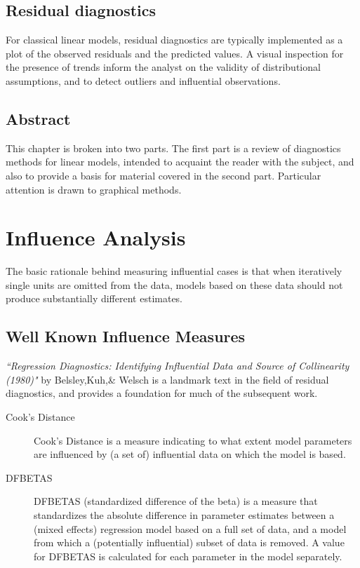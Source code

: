 \documentclass[12pt, a4paper]{report}
\begin{document}
	\subsection{Residual diagnostics} %
	For classical linear models, residual diagnostics are typically implemented as a plot of the observed residuals and the predicted values. A visual inspection for the presence of trends inform the analyst on the validity of distributional assumptions, and to detect outliers and influential observations.
	

	
	\subsection*{Abstract}
	This chapter is broken into two parts. The first part is a review of diagnostics methods for linear models, intended to acquaint the reader with the subject, and also to provide a basis for material covered in the second part. Particular attention is drawn to graphical methods.
	

\section*{Influence Analysis}
The basic rationale behind measuring influential cases is that when iteratively single units are omitted
from the data, models based on these data should not produce substantially different estimates.
\subsection*{Well Known Influence Measures}

\textit{``Regression Diagnostics: Identifying Influential Data
	and Source of Collinearity (1980)"} by Belsley,Kuh,\& Welsch is a landmark text in the field of residual diagnostics, and
provides a foundation for much of the subsequent work.

\begin{description}
	\item[Cook's Distance] Cook’s Distance is a measure indicating to what extent model parameters are influenced by (a set
	of) influential data on which the model is based.
	\item[DFBETAS] DFBETAS (standardized difference of the beta) is a measure that standardizes the absolute difference
	in parameter estimates between a (mixed effects) regression model based on a full set of
	data, and a model from which a (potentially influential) subset of data is removed. A value for
	DFBETAS is calculated for each parameter in the model separately.
\end{description}
\end{document}
